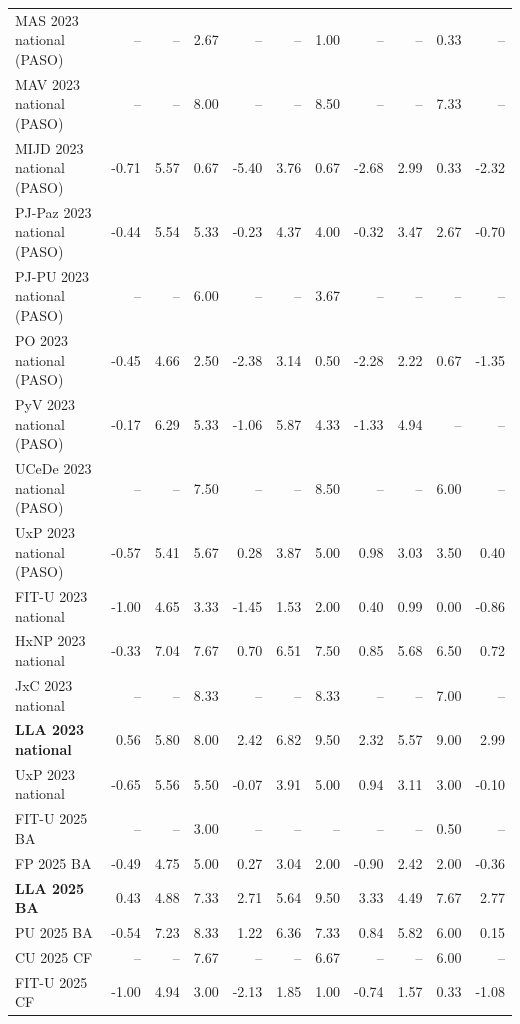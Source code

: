 \begin{table}[htbp]
{\begin{tabular}{@{}lrrrrrrrrrr@{}}
MAS 2023 national (PASO) & -- & -- & 2.67 & -- & -- & 1.00 & -- & -- & 0.33 & -- \\
MAV 2023 national (PASO) & -- & -- & 8.00 & -- & -- & 8.50 & -- & -- & 7.33 & -- \\
MIJD 2023 national (PASO) & -0.71 & 5.57 & 0.67 & -5.40 & 3.76 & 0.67 & -2.68 & 2.99 & 0.33 & -2.32 \\
PJ-Paz 2023 national (PASO) & -0.44 & 5.54 & 5.33 & -0.23 & 4.37 & 4.00 & -0.32 & 3.47 & 2.67 & -0.70 \\
PJ-PU 2023 national (PASO) & -- & -- & 6.00 & -- & -- & 3.67 & -- & -- & -- & -- \\
PO 2023 national (PASO) & -0.45 & 4.66 & 2.50 & -2.38 & 3.14 & 0.50 & -2.28 & 2.22 & 0.67 & -1.35 \\
PyV 2023 national (PASO) & -0.17 & 6.29 & 5.33 & -1.06 & 5.87 & 4.33 & -1.33 & 4.94 & -- & -- \\
UCeDe 2023 national (PASO) & -- & -- & 7.50 & -- & -- & 8.50 & -- & -- & 6.00 & -- \\
UxP 2023 national (PASO) & -0.57 & 5.41 & 5.67 & 0.28 & 3.87 & 5.00 & 0.98 & 3.03 & 3.50 & 0.40 \\
FIT-U 2023 national & -1.00 & 4.65 & 3.33 & -1.45 & 1.53 & 2.00 & 0.40 & 0.99 & 0.00 & -0.86 \\
HxNP 2023 national & -0.33 & 7.04 & 7.67 & 0.70 & 6.51 & 7.50 & 0.85 & 5.68 & 6.50 & 0.72 \\
JxC 2023 national & -- & -- & 8.33 & -- & -- & 8.33 & -- & -- & 7.00 & -- \\
\textbf{LLA 2023 national} & 0.56 & 5.80 & 8.00 & 2.42 & 6.82 & 9.50 & 2.32 & 5.57 & 9.00 & 2.99 \\
UxP 2023 national & -0.65 & 5.56 & 5.50 & -0.07 & 3.91 & 5.00 & 0.94 & 3.11 & 3.00 & -0.10 \\
FIT-U 2025 BA & -- & -- & 3.00 & -- & -- & -- & -- & -- & 0.50 & -- \\
FP 2025 BA & -0.49 & 4.75 & 5.00 & 0.27 & 3.04 & 2.00 & -0.90 & 2.42 & 2.00 & -0.36 \\
\textbf{LLA 2025 BA} & 0.43 & 4.88 & 7.33 & 2.71 & 5.64 & 9.50 & 3.33 & 4.49 & 7.67 & 2.77 \\
PU 2025 BA & -0.54 & 7.23 & 8.33 & 1.22 & 6.36 & 7.33 & 0.84 & 5.82 & 6.00 & 0.15 \\
CU 2025 CF & -- & -- & 7.67 & -- & -- & 6.67 & -- & -- & 6.00 & -- \\
FIT-U 2025 CF & -1.00 & 4.94 & 3.00 & -2.13 & 1.85 & 1.00 & -0.74 & 1.57 & 0.33 & -1.08 \\

\end{tabular}}
\end{table}
